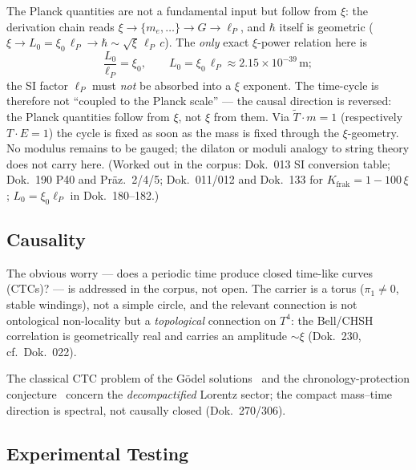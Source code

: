 \documentclass[11pt,a4paper]{article}
\begin{document}
The Planck quantities are not a fundamental input but follow from $\xi$: the derivation chain reads $\xi \to \{m_e,\dots\} \to G \to \ell_P$, and $\hbar$ itself is geometric ($\xi \to L_0 = \xi_0\,\ell_P \to \hbar \sim \sqrt{\xi}\,\ell_P\,c$). The \emph{only} exact $\xi$-power relation here is
\[
 \frac{L_0}{\ell_P} = \xi_0, \qquad L_0 = \xi_0\,\ell_P \approx 2.15\times10^{-39}\,\text{m};
\]
the SI factor $\ell_P$ must \emph{not} be absorbed into a $\xi$ exponent. The time-cycle is therefore not ``coupled to the Planck scale'' --- the causal direction is reversed: the Planck quantities follow from $\xi$, not $\xi$ from them. Via $\tilde{T}\cdot m = 1$ (respectively $T\cdot E = 1$) the cycle is fixed as soon as the mass is fixed through the $\xi$-geometry. No modulus remains to be gauged; the dilaton or moduli analogy to string theory does not carry here. (Worked out in the corpus: Dok.~013 SI conversion table; Dok.~190 P40 and Präz.~2/4/5; Dok.~011/012 and Dok.~133 for $K_\text{frak}=1-100\,\xi$; $L_0=\xi_0\ell_P$ in Dok.~180--182.)

\subsection{Causality}

The obvious worry --- does a periodic time produce closed time-like curves (CTCs)? --- is addressed in the corpus, not open. The carrier is a torus ($\pi_1\neq0$, stable windings), not a simple circle, and the relevant connection is not ontological non-locality but a \emph{topological} connection on $T^4$: the Bell/CHSH correlation is geometrically real and carries an amplitude $\sim\xi$ (Dok.~230, cf.\ Dok.~022).

The classical CTC problem of the Gödel solutions~\cite{Goedel1949} and the chronology-protection conjecture~\cite{Hawking1992} concern the \emph{decompactified} Lorentz sector; the compact mass--time direction is spectral, not causally closed (Dok.~270/306).

\subsection{Experimental Testing}
\end{document}
